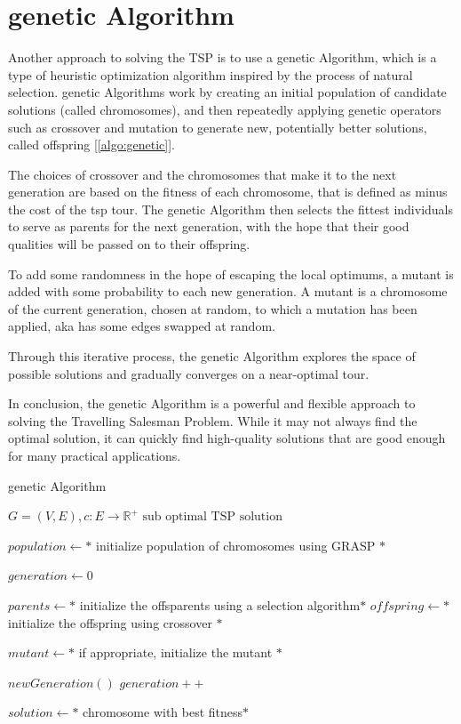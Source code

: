	




\section{genetic Algorithm}
Another approach to solving the TSP is to use a genetic Algorithm, which is a type of heuristic optimization algorithm inspired by the process of natural selection. genetic Algorithms work by creating an initial population of candidate solutions (called chromosomes), and then repeatedly applying genetic operators such as crossover and mutation to generate new, potentially better solutions, called offspring [\ref{algo:genetic}].


The choices of crossover and the chromosomes that make it to the next generation are based on the fitness of each chromosome, that is defined as minus the cost of the tsp tour. The genetic Algorithm then selects the fittest individuals to serve as parents for the next generation, with the hope that their good qualities will be passed on to their offspring.

To add some randomness in the hope of escaping the local optimums, a mutant is added with some probability to each new generation. A mutant is a chromosome of the current generation, chosen at random, to which a mutation has been applied, aka has some edges swapped at random.

Through this iterative process, the genetic Algorithm explores the space of possible solutions and gradually converges on a near-optimal tour.

In conclusion, the genetic Algorithm is a powerful and flexible approach to solving the Travelling Salesman Problem. While it may not always find the optimal solution, it can quickly find high-quality solutions that are good enough for many practical applications.

\begin{algorithm}
    \caption{genetic Algorithm}\label{algo:genetic}
    \begin{algorithmic}[1]
    \Require $G = (V,E), c:E \to \mathbb{R}^+$
    \Ensure $\text{sub optimal TSP solution}$
    
    \State $population \gets *$ initialize population of chromosomes using GRASP $*$

    \State $ generation \gets 0$


        \State $parents \gets *$ initialize the offsparents  using a selection algorithm$*$
        \State $offspring \gets *$ initialize the offspring using crossover $*$

        \State $mutant \gets *$ if appropriate, initialize the mutant $*$

        \State $ newGeneration() $
        \State $ generation++ $

    \EndWhile

    \State $ solution \gets *$ chromosome with best fitness$*$

    

    \end{algorithmic}
\end{algorithm}

